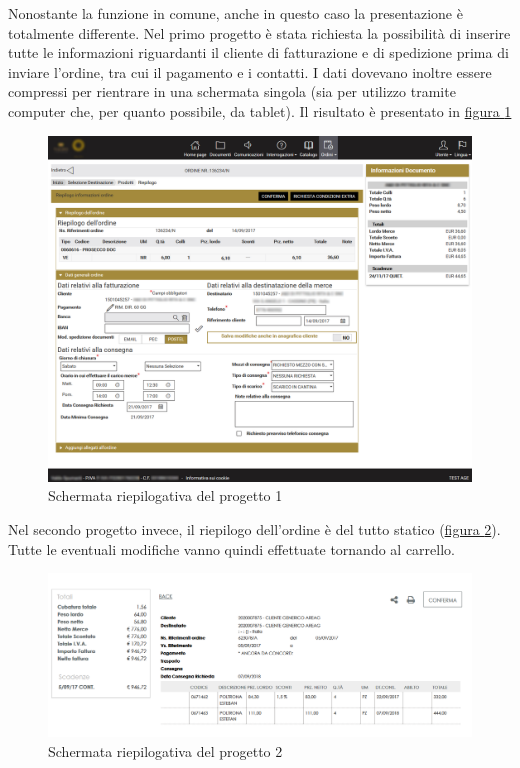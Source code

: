 Nonostante la funzione in comune, anche in questo caso la presentazione è totalmente differente. Nel primo progetto è stata richiesta la possibilità di inserire tutte le informazioni riguardanti il cliente di fatturazione e di spedizione prima di inviare l'ordine, tra cui il pagamento e i contatti. I dati dovevano inoltre essere compressi per rientrare in una schermata singola (sia per utilizzo tramite computer che, per quanto possibile, da tablet). Il risultato è presentato in \hyperref[fig:summary-1]{figura \ref{fig:summary-1}}
\begin{figure}[H]
	\centering
	\includegraphics[width=\linewidth]{Immagini/p1/summary.png}
	\caption{Schermata riepilogativa del progetto 1}
	\label{fig:summary-1}
\end{figure}
Nel secondo progetto invece, il riepilogo dell'ordine è del tutto statico (\hyperref[fig:summary-2]{figura \ref{fig:summary-2}}). Tutte le eventuali modifiche vanno quindi effettuate tornando al carrello.
\begin{figure}[H]
	\centering
	\includegraphics[width=\linewidth]{Immagini/p2/summary.png}
	\caption{Schermata riepilogativa del progetto 2}
	\label{fig:summary-2}
\end{figure}


